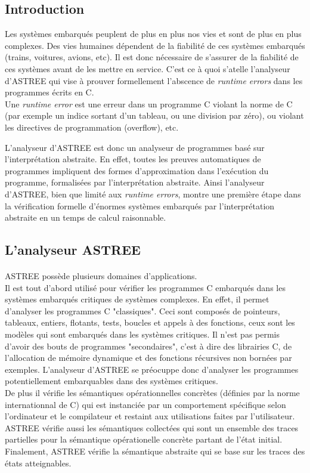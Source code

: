 \documentclass[french]{report}
\begin{document}
\subsection{Introduction}
Les systèmes embarqués peuplent de plus en plus nos vies et sont de plus en plus complexes. Des vies humaines
dépendent de la fiabilité de ces systèmes embarqués (trains, voitures, avions, etc). Il est donc nécessaire de
s'assurer de la fiabilité de ces systèmes avant de les mettre en service.
C'est ce à quoi s'atelle l'analyseur d'ASTREE qui vise à prouver formellement
l'abscence de \textit{runtime errors} dans les programmes écrits en C. \\

Une \textit{runtime error} est une erreur dans un programme C violant la norme de C (par exemple un indice sortant
d'un tableau, ou une division par zéro), ou violant les directives de programmation (overflow), etc.

L'analyseur d'ASTREE est donc un analyseur de programmes basé sur l'interprétation abstraite. En effet, toutes les preuves
automatiques de programmes impliquent des formes d'approximation dans l'exécution du programme, formalisées par
l'interprétation abstraite.
Ainsi l'analyseur d'ASTREE, bien que limité aux \textit{runtime errors}, montre une première étape
dans la vérification formelle d'énormes systèmes embarqués par l'interprétation abstraite en un temps de calcul
raisonnable.

\subsection{L'analyseur ASTREE}

\paragraph{}
ASTREE possède plusieurs domaines d'applications. \\
Il est tout d'abord utilisé pour vérifier les programmes C embarqués dans les systèmes embarqués critiques
de systèmes complexes. En effet, il permet d'analyser les programmes C "classiques". Ceci sont composés de pointeurs,
tableaux, entiers, flotants, tests, boucles et appels à des fonctions, ceux sont les modèles qui sont embarqués dans les
systèmes critiques. Il n'est pas permis d'avoir des bouts de programmes "secondaires", c'est à dire des librairies C,
de l'allocation de mémoire dynamique et des fonctions récursives non bornées par exemples. L'analyseur d'ASTREE se
préocuppe donc d'analyser les programmes potentiellement embarquables dans des systèmes critiques. \\
De plus il vérifie les sémantiques opérationnelles concrètes (définies par la norme internationnal de C) qui
est instanciée par un comportement spécifique selon l'ordinateur et le compilateur et restaint aux utilisations faites par
l'utilisateur.
ASTREE vérifie aussi les sémantiques collectées qui sont un ensemble des traces partielles pour
la sémantique opérationelle concrète partant de l'état initial. Finalement, ASTREE vérifie la sémantique abstraite
qui se base sur les traces des états atteignables.
\end{document}

